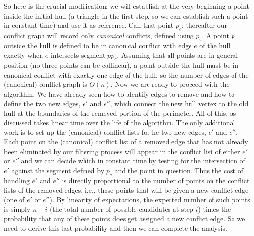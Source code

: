 \documentclass[11pt]{article}
\begin{document}
So here is the crucial modification: we will establish at the very beginning
a point inside the initial hull (a triangle in the first step, so we can
establish such a point in constant time) and use it as reference.  Call
that point $p_c$; thereafter our conflict graph will record only
\emph{canonical} conflicts, defined using $p_c$.   A point $p$ outside
the hull is defined to be in canonical conflict with edge $e$ of the
hull exactly when $e$ intersects segment $\overline{pp_c}$.  Assuming
that all points are in general position (no three points can be collinear),
a point outside the hull must be in canonical conflict with exactly one
edge of the hull, so the number of edges of the (canonical) conflict graph
is $O(n)$.  Now we are ready to proceed with the algorithm.  We have already
seen how to identify edges to remove and how to define the two new edges,
$e'$ and $e''$, which connect the new hull vertex to the old hull at
the boundaries of the removed portion of the perimeter.  All of this,
as discussed takes linear time over the life of the algorithm.
The only additional work is to set up the (canonical) conflict lists for 
he two new edges, $e'$ and $e''$.  Each point on the (canonical) conflict
list of a removed edge that has not already been eliminated by our
filtering process will appear in the conflict list of either $e'$ or $e''$
and we can decide which in constant time by testing for the intersection of
$e'$ against the segment defined by $p_c$ and the point in question.
Thus the cost of handling $e'$ and $e''$ is directly proportional to the
number of points on the conflict lists of the removed edges, i.e., those
points that will be given a new conflict edge (one of $e'$ or $e''$).
By linearity of expectations, the expected number of such points is
simply $n-i$ (the total number of possible candidates at step $i$)
times the probability that any of these points does get assigned a new
conflict edge.  So we need to derive this last probability and then
we can complete the analysis.
\end{document}
